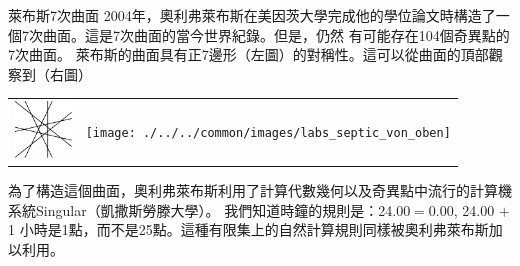 \begin{surferPage}{萊布斯7次曲面}
2004年，奧利弗萊布斯在美因茨大學完成他的學位論文時構造了一個7次曲面。這是7次曲面的當今世界紀錄。但是，仍然
有可能存在104個奇異點的7次曲面。  萊布斯的曲面具有正7邊形（左圖）的對稱性。這可以從曲面的頂部觀察到（右圖）

    \vspace*{-0.3em}
    \begin{center}
      \begin{tabular}{c@{\qquad}c}
        \includegraphics[height=1.5cm]{./../../common/images/labsseptic1.pdf}
        &
        \texttt{[image: ./../../common/images/labs\_septic\_von\_oben]}
      \end{tabular}
    \end{center}
    \vspace*{-0.3em}

為了構造這個曲面，奧利弗萊布斯利用了計算代數幾何以及奇異點中流行的計算機系統{\sc Singular}（凱撒斯勞滕大學）。
我們知道時鐘的規則是：24.00$=$0.00, 24.00 $+$ 1 小時是1點，而不是25點。這種有限集上的自然計算規則同樣被奧利弗萊布斯加以利用。
\end{surferPage}
